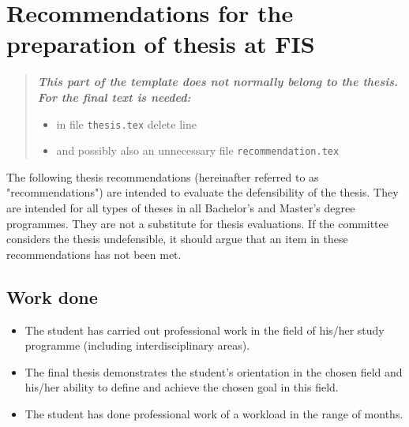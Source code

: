 \chapter*{Recommendations for the preparation of thesis at FIS}

\begin{quote}
\bfseries\itshape
This part of the template does not normally belong to the thesis. For the final
text is needed:
\begin{itemize}
\item in file \verb|thesis.tex| delete line \verb||
\item and possibly also an unnecessary file \verb|recommendation.tex|
\end{itemize}
\end{quote}

The following thesis recommendations (hereinafter referred to as 
"recommendations") are intended to evaluate the defensibility of the thesis. 
They are intended for all types of theses in all Bachelor's and Master's degree 
programmes. They are not a substitute for thesis evaluations. If the committee 
considers the thesis undefensible, it should argue that an item in these 
recommendations has not been met.

\section*{Work done}
\begin{itemize}
\item \vspace*{-2ex}The student has carried out professional work in the field of his/her study programme (including interdisciplinary areas).
\item The final thesis demonstrates the student's orientation in the chosen field and his/her ability to define and achieve the chosen goal in this field. 
\item The student has done professional work of a workload in the range of months.
\end{itemize}

